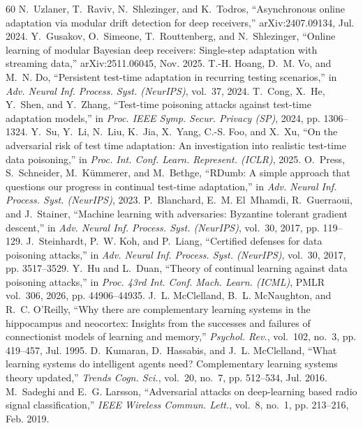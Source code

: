 \documentclass[journal]{IEEEtran}
\theoremstyle{remark}
\begin{document}
\begin{thebibliography}{60}
 N.~Uzlaner, T.~Raviv, N.~Shlezinger, and K.~Todros, ``Asynchronous online adaptation via modular drift detection for deep receivers,'' arXiv:2407.09134, Jul. 2024.
 Y.~Gusakov, O.~Simeone, T.~Routtenberg, and N.~Shlezinger, ``Online learning of modular Bayesian deep receivers: Single-step adaptation with streaming data,'' arXiv:2511.06045, Nov. 2025.
 T.-H. Hoang, D.~M. Vo, and M.~N. Do, ``Persistent test-time adaptation in recurring testing scenarios,'' in \emph{Adv. Neural Inf. Process. Syst. (NeurIPS)}, vol.~37, 2024.
 T.~Cong, X.~He, Y.~Shen, and Y.~Zhang, ``Test-time poisoning attacks against test-time adaptation models,'' in \emph{Proc. IEEE Symp. Secur. Privacy (SP)}, 2024, pp. 1306--1324.
 Y.~Su, Y.~Li, N.~Liu, K.~Jia, X.~Yang, C.-S. Foo, and X.~Xu, ``On the adversarial risk of test time adaptation: An investigation into realistic test-time data poisoning,'' in \emph{Proc. Int. Conf. Learn. Represent. (ICLR)}, 2025.
 O.~Press, S.~Schneider, M.~K{\"u}mmerer, and M.~Bethge, ``RDumb: A simple approach that questions our progress in continual test-time adaptation,'' in \emph{Adv. Neural Inf. Process. Syst. (NeurIPS)}, 2023.
 P.~Blanchard, E.~M. El~Mhamdi, R.~Guerraoui, and J.~Stainer, ``Machine learning with adversaries: Byzantine tolerant gradient descent,'' in \emph{Adv. Neural Inf. Process. Syst. (NeurIPS)}, vol.~30, 2017, pp. 119--129.
 J.~Steinhardt, P.~W. Koh, and P.~Liang, ``Certified defenses for data poisoning attacks,'' in \emph{Adv. Neural Inf. Process. Syst. (NeurIPS)}, vol.~30, 2017, pp. 3517--3529.
 Y.~Hu and L.~Duan, ``Theory of continual learning against data poisoning attacks,'' in \emph{Proc. 43rd Int. Conf. Mach. Learn. (ICML)}, PMLR vol.~306, 2026, pp. 44906--44935.
 J.~L. McClelland, B.~L. McNaughton, and R.~C. O'Reilly, ``Why there are complementary learning systems in the hippocampus and neocortex: Insights from the successes and failures of connectionist models of learning and memory,'' \emph{Psychol. Rev.}, vol.~102, no.~3, pp. 419--457, Jul. 1995.
 D.~Kumaran, D.~Hassabis, and J.~L. McClelland, ``What learning systems do intelligent agents need? Complementary learning systems theory updated,'' \emph{Trends Cogn. Sci.}, vol.~20, no.~7, pp. 512--534, Jul. 2016.
 M.~Sadeghi and E.~G. Larsson, ``Adversarial attacks on deep-learning based radio signal classification,'' \emph{IEEE Wireless Commun. Lett.}, vol.~8, no.~1, pp. 213--216, Feb. 2019.

\end{thebibliography}
\end{document}
